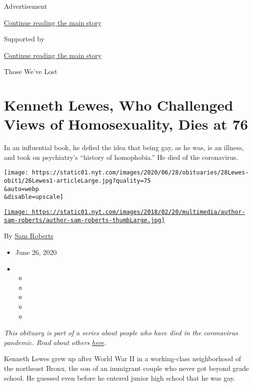 Advertisement

\protect\hyperlink{after-top}{Continue reading the main story}

Supported by

\protect\hyperlink{after-sponsor}{Continue reading the main story}

Those We've Lost

\hypertarget{kenneth-lewes-who-challenged-views-of-homosexuality-dies-at-76}{%
\section{Kenneth Lewes, Who Challenged Views of Homosexuality, Dies at
76}\label{kenneth-lewes-who-challenged-views-of-homosexuality-dies-at-76}}

In an influential book, he defied the idea that being gay, as he was, is
an illness, and took on psychiatry's ``history of homophobia.'' He died
of the coronavirus.

\texttt{[image: https://static01.nyt.com/images/2020/06/28/obituaries/28Lewes-obit1/26Lewes1-articleLarge.jpg?quality=75\\\&auto=webp\\\&disable=upscale]}

\href{https://www.nytimes.com/by/sam-roberts}{\texttt{[image: https://static01.nyt.com/images/2018/02/20/multimedia/author-sam-roberts/author-sam-roberts-thumbLarge.jpg]}}

By \href{https://www.nytimes.com/by/sam-roberts}{Sam Roberts}

\begin{itemize}
\item
  June 26, 2020
\item
  \begin{itemize}
  \item
  \item
  \item
  \item
  \item
  \end{itemize}
\end{itemize}

\emph{This obituary is part of a series about people who have died in
the coronavirus pandemic. Read about others}
\href{https://www.nytimes.com/interactive/2020/obituaries/people-died-coronavirus-obituaries.html}{\emph{here}}\emph{.}

Kenneth Lewes grew up after World War II in a working-class neighborhood
of the northeast Bronx, the son of an immigrant couple who never got
beyond grade school. He guessed even before he entered junior high
school that he was gay.


